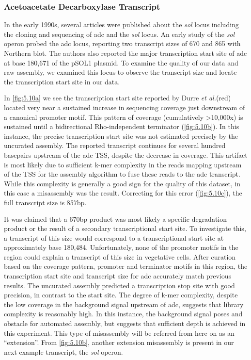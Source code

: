 \subsubsection{Acetoacetate Decarboxylase Transcript}
In the early 1990s, several articles were published about the \textit{sol} locus including the cloning and sequencing of adc and the \textit{sol} locus\cite{62,63,64,65,66}. An early study of the \textit{sol} operon probed the adc locus, reporting two transcript sizes of 670 and 865 with Northern blot\cite{65}. The authors also reported the major transcription start site of adc at base 180,671 of the pSOL1 plasmid. To examine the quality of our data and raw assembly, we examined this locus to observe the transcript size and locate the transcription start site in our data. 

In \ref{fig:5.10a} we see the transcription start site reported by Durre \textit{et al.}(red)\cite{65} located very near a sustained increase in sequencing coverage just downstream of a canonical promoter motif. This pattern of coverage (cumulatively \textgreater 10,000x) is sustained until a bidirectional Rho-independent terminator (\ref{fig:5.10b}). In this instance, the precise transcription start site was not estimated precisely by the uncurated assembly. The reported transcript continues for several hundred basepairs upstream of the adc TSS, despite the decrease in coverage. This artifact is most likely due to sufficient k-mer complexity in the reads mapping upstream of the TSS for the assembly algorithm to fuse these reads to the adc transcript. While this complexity is generally a good sign for the quality of this dataset, in this case a misassembly was the result. Correcting for this error (\ref{fig:5.10c}), the full transcript size is 857bp.

It was claimed that a 670bp product was most likely a specific degradation product or the result of a secondary transcriptional start site\cite{65}. To investigate this, a transcript of this size would correspond to a transcriptional start site at approximately base 180,484. Unfortunately, none of the promoter motifs in the region could explain a transcript of this size in vegetative cells. After curation based on the coverage pattern, promoter and terminator motifs in this region, the transcription start site and transcript size for adc accurately match previous results. The uncurated assembly predicted a transcription stop site with good precision, in contrast to the start site. The degree of k-mer complexity, despite the low coverage in the background signal upstream of adc, suggests that library complexity is reasonably high. In this instance, the background signal poses and obstacle for automated assembly, but suggests that sufficient depth is achieved in this experiment. This type of misassembly will be referred from here on as an ``extension''. From \ref{fig:5.10b}, another extension misassembly is present in our next example transcript, the \textit{sol} operon.


